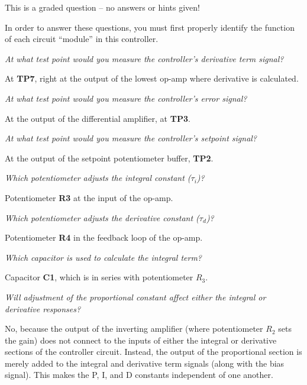 \vfil 

\eject






This is a graded question -- no answers or hints given!







In order to answer these questions, you must first properly identify the function of each circuit ``module'' in this controller.

\vskip 10pt

{\it At what test point would you measure the controller's derivative term signal?}

At {\bf TP7}, right at the output of the lowest op-amp where derivative is calculated.
 
\vskip 10pt

{\it At what test point would you measure the controller's error signal?}

At the output of the differential amplifier, at {\bf TP3}.
 
\vskip 10pt

{\it At what test point would you measure the controller's setpoint signal?}

At the output of the setpoint potentiometer buffer, {\bf TP2}.
 
\vskip 10pt

{\it Which potentiometer adjusts the integral constant ($\tau_i$)?}

Potentiometer {\bf R3} at the input of the op-amp.
 
\vskip 10pt

{\it Which potentiometer adjusts the derivative constant ($\tau_d$)?}

Potentiometer {\bf R4} in the feedback loop of the op-amp.
 
\vskip 10pt

{\it Which capacitor is used to calculate the integral term?}

Capacitor {\bf C1}, which is in series with potentiometer $R_3$.
 
\vskip 10pt

{\it Will adjustment of the proportional constant affect either the integral or derivative responses?}

No, because the output of the inverting amplifier (where potentiometer $R_2$ sets the gain) does not connect to the inputs of either the integral or derivative sections of the controller circuit.  Instead, the output of the proportional section is merely added to the integral and derivative term signals (along with the bias signal).  This makes the P, I, and D constants independent of one another.
 

